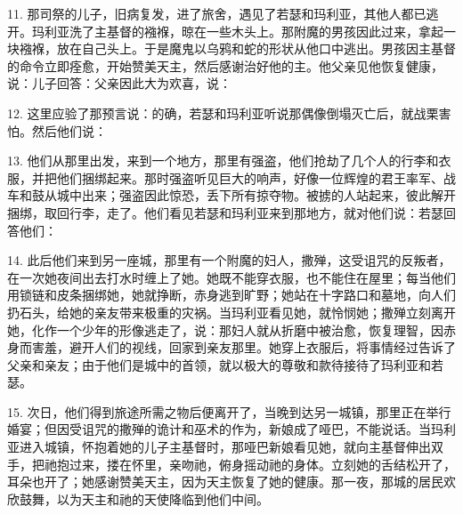 11. 那司祭的儿子，旧病复发，进了旅舍，遇见了若瑟和玛利亚，其他人都已逃开。玛利亚洗了主基督的襁褓，晾在一些木头上。那附魔的男孩因此过来，拿起一块襁褓，放在自己头上。于是魔鬼以乌鸦和蛇的形状从他口中逃出。男孩因主基督的命令立即痊愈，开始赞美天主，然后感谢治好他的主。他父亲见他恢复健康，说：儿子回答：父亲因此大为欢喜，说：\par

12. 这里应验了那预言说：的确，若瑟和玛利亚听说那偶像倒塌灭亡后，就战栗害怕。然后他们说：\par

13. 他们从那里出发，来到一个地方，那里有强盗，他们抢劫了几个人的行李和衣服，并把他们捆绑起来。那时强盗听见巨大的响声，好像一位辉煌的君王率军、战车和鼓从城中出来；强盗因此惊恐，丢下所有掠夺物。被掳的人站起来，彼此解开捆绑，取回行李，走了。他们看见若瑟和玛利亚来到那地方，就对他们说：若瑟回答他们：\par

14. 此后他们来到另一座城，那里有一个附魔的妇人，撒殚，这受诅咒的反叛者，在一次她夜间出去打水时缠上了她。她既不能穿衣服，也不能住在屋里；每当他们用锁链和皮条捆绑她，她就挣断，赤身逃到旷野；她站在十字路口和墓地，向人们扔石头，给她的亲友带来极重的灾祸。当玛利亚看见她，就怜悯她；撒殚立刻离开她，化作一个少年的形像逃走了，说：那妇人就从折磨中被治愈，恢复理智，因赤身而害羞，避开人们的视线，回家到亲友那里。她穿上衣服后，将事情经过告诉了父亲和亲友；由于他们是城中的首领，就以极大的尊敬和款待接待了玛利亚和若瑟。\par

15. 次日，他们得到旅途所需之物后便离开了，当晚到达另一城镇，那里正在举行婚宴；但因受诅咒的撒殚的诡计和巫术的作为，新娘成了哑巴，不能说话。当玛利亚进入城镇，怀抱着她的儿子主基督时，那哑巴新娘看见她，就向主基督伸出双手，把祂抱过来，搂在怀里，亲吻祂，俯身摇动祂的身体。立刻她的舌结松开了，耳朵也开了；她感谢赞美天主，因为天主恢复了她的健康。那一夜，那城的居民欢欣鼓舞，以为天主和祂的天使降临到他们中间。\par

